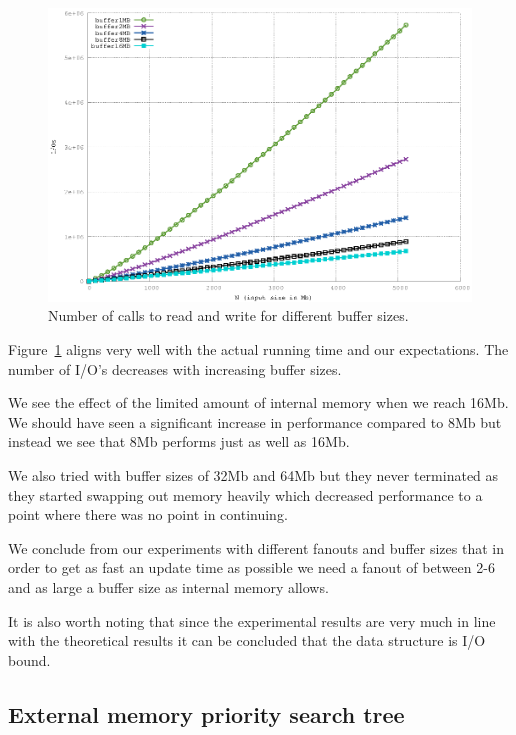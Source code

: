\documentclass[twoside,11pt,openright]{report}
\begin{document}
\begin{figure}[htp]
\includegraphics[width=\textwidth]{../src/experiments/gerth_buffer_size_experiment_results/2016-05-03.13_51_54/ios}
\caption{Number of calls to read and write for different buffer sizes.}
\label{fig:gerth_buffer_size_ios}
\end{figure}

Figure~\ref{fig:gerth_buffer_size_ios} aligns very well with the actual running time and our expectations. The number of I/O's decreases with increasing buffer sizes.

We see the effect of the limited amount of internal memory when we reach 16Mb. We should have seen a significant increase in performance compared to 8Mb but instead we see that 8Mb performs just as well as 16Mb.

We also tried with buffer sizes of 32Mb and 64Mb but they never terminated as they started swapping out memory heavily which decreased performance to a point where there was no point in continuing.

We conclude from our experiments with different fanouts and buffer sizes that in order to get as fast an update time as possible we need a fanout of between 2-6 and as large a buffer size as internal memory allows.

It is also worth noting that since the experimental results are very much in line with the theoretical results it can be concluded that the data structure is I/O bound.

\subsection{External memory priority search tree}
\label{subsec:tuning_arge}
\end{document}
